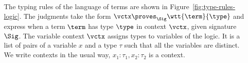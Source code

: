 The typing rules of the language of terms are shown in Figure~\ref{fig:type-rules-logic}.
The judgments take the form $\vctx \proves_\Sig \wtt{\term}{\type}$ and express when a term $\term$ has type $\type$ in context $\vctx$, given signature $\Sig$.
The variable context $\vctx$ assigns types to variables of the logic.
It is a list of pairs of a variable $x$ and a type $\tau$ such that all the variables are distinct.
We write contexts in the usual way, \eg{} $x_1 : \tau_1, x_2 : \tau_2$ is a context.

\newcommand{\typingrules}{
  \centering
\judgment[Well-typed terms of the basic logic]{\vctx \proves_\Sig \wtt{\term}{\type}}
\begin{mathparpagebreakable}
	\infer{ }{x : \type \proves \wtt{x}{\type}}
\and
	\infer{\vctx \proves \wtt{\term}{\type}}
		{\vctx, x:\type' \proves \wtt{\term}{\type}}
\and
	\infer{\vctx, x:\type', y:\type' \proves \wtt{\term}{\type}}
		{\vctx, x:\type' \proves \wtt{\term[x/y]}{\type}}
\and
	\infer{\vctx_1, x:\type', y:\type'', \vctx_2 \proves \wtt{\term}{\type}}
		{\vctx_1, x:\type'', y:\type', \vctx_2 \proves \wtt{\term[y/x,x/y]}{\type}}
\and
	\infer{
		\vctx \proves \wtt{\term_1}{\type_1} \and
		\cdots \and
		\vctx \proves \wtt{\term_n}{\type_n} \and
		\sigfn : \type_1, \dots, \type_n \to \type_{n+1} \in \SigFn
	}{
		\vctx \proves \wtt {\sigfn(\term_1, \dots, \term_n)} {\type_{n+1}}
	}
\and
    \infer{v \in \Val}{\vctx \proves \wtt{v}{\Val}}
\and
    \infer{e \in \Expr}{\vctx \proves \wtt{e}{\Expr}}
\and
	\infer{ }{\vctx \proves \wtt{()}{1}}
\and
	\infer{\vctx \proves \wtt{\term}{\type_1} \and \vctx \proves \wtt{\termB}{\type_2}}
		{\vctx \proves \wtt{(\term,\termB)}{\type_1 \times \type_2}}
\and
	\infer{\vctx \proves \wtt{\term}{\type_1 \times \type_2} \and i \in \{1, 2\}}
		{\vctx \proves \wtt{\pi_i\,\term}{\type_i}}
\and
	\infer{\vctx, x:\type \proves \wtt{\term}{\type'}}
		{\vctx \proves \wtt{\Lam x. \term}{\type \to \type'}}
\and
	\infer
	{\vctx \proves \wtt{\term}{\type \to \type'} \and \wtt{\termB}{\type}}
	{\vctx \proves \wtt{\term(\termB)}{\type'}}
\\
	\infer{ }{\vctx \proves \wtt{\FALSE}{\Prop}}
\and
	\infer{ }{\vctx \proves \wtt{\TRUE}{\Prop}}
\and
	\infer{\vctx \proves \wtt{\term}{\type} \and \vctx \proves \wtt{\termB}{\type}}
		{\vctx \proves \wtt{\term =_\type \termB}{\Prop}}
\and
	\infer{\vctx \proves \wtt{\prop}{\Prop} \and \vctx \proves \wtt{\propB}{\Prop}}
		{\vctx \proves \wtt{\prop \Ra \propB}{\Prop}}
\and

\end{mathparpagebreakable}}
